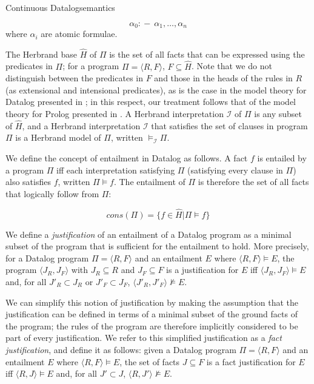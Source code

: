 \begin{nestedsection}{Continuous Datalog}{semantics}
\begin{definition}[Datalog]
\[\alpha_0 :\!-\ \alpha_1 , \ldots , \alpha_n\]
where $\alpha_i$ are atomic formulae.

The Herbrand base $\hat{H}$ of $\Pi$ is the set of all facts that can
be expressed using the predicates in $\Pi$; for a program $\Pi =
\langle R, F \rangle$, $F \subseteq \hat{H}$. Note that we do not
distinguish between the predicates in $F$ and those in the heads of
the rules in $R$ (as extensional and intensional predicates), as is
the case in the model theory for Datalog presented in
\cite{datalog-basics}; in this respect, our treatment follows that of
the model theory for Prolog presented in \cite{prolog-semantics}. A
Herbrand interpretation $\mathcal{I}$ of $\Pi$ is any subset of
$\hat{H}$, and a Herbrand interpretation $\mathcal{I}$ that satisfies
the set of clauses in program $\Pi$ is a Herbrand model of $\Pi$,
written $\models_{\mathcal{I}} \Pi$.

We define the concept of entailment in Datalog as follows. A fact $f$
is entailed by a program $\Pi$ iff each interpretation satisfying
$\Pi$ (satisfying every clause in $\Pi$) also satisfies $f$, written
$\Pi \models f$. The entailment of $\Pi$ is therefore the set of all
facts that logically follow from $\Pi$:

\[cons(\Pi) = \{ f \in \hat{H} | \Pi \models f \}\]


\end{definition}

\begin{definition}[Justification]

We define a {\em justification} of an entailment of a Datalog program
as a minimal subset of the program that is sufficient for the
entailment to hold. More precisely, for a Datalog program
$\Pi = \langle R, F \rangle$ and an entailment $E$ where
$\langle R, F \rangle \models E$, the program $\langle J_R, J_F \rangle$
with $J_R \subseteq R$ and $J_F \subseteq F$ is a justification for $E$
iff $\langle J_R, J_F \rangle \models E$ and, for all $J'_R \subset J_R$ or $J'_F \subset J_F$, $\langle J'_R, J'_F \rangle \not\models E$.

We can simplify this notion of justification by making the assumption
that the justification can be defined in terms of a minimal subset of
the ground facts of the program; the rules of the program are
therefore implicitly considered to be part of every justification. We
refer to this simplified justification as a {\em fact justification},
and define it as follows: given a Datalog program $\Pi = \langle R, F
\rangle$ and an entailment $E$ where $\langle R, F \rangle \models E$,
the set of facts $J \subseteq F$ is a fact justification for $E$ iff
$\langle R, J \rangle \models E$ and, for all $J' \subset J$, $\langle R, J' \rangle
\not\models E$.
\end{definition}


\end{nestedsection}
